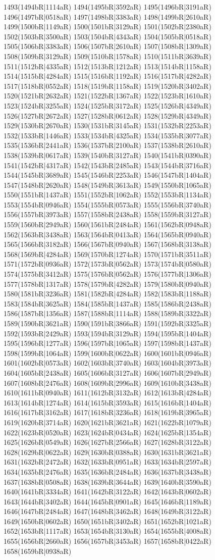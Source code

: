 1493(1494bR|1114aR) 1494(1495bR|3592aR) 1495(1496bR|3191aR) 1496(1497bR|0518aR) 1497(1498bR|3383aR) 1498(1499bR|2610aR) 1499(1500bR|1149aR) 1500(1501bR|3129aR) 1501(1502bR|2380aR) 1502(1503bR|3500aR) 1503(1504bR|4343aR) 1504(1505bR|0518aR) 1505(1506bR|3383aR) 1506(1507bR|2610aR) 1507(1508bR|1309aR) 1508(1509bR|3129aR) 1509(1510bR|1578aR) 1510(1511bR|3639aR) 1511(1512bR|4335aR) 1512(1513bR|1212aR) 1513(1514bR|1158aR) 1514(1515bR|4284aR) 1515(1516bR|1192aR) 1516(1517bR|4282aR) 1517(1518bR|0552aR) 1518(1519bR|1158aR) 1519(1520bR|3402aR) 1520(1521bR|2632aR) 1521(1522bR|1367aR) 1522(1523bR|1610aR) 1523(1524bR|3255aR) 1524(1525bR|3172aR) 1525(1526bR|4349aR) 1526(1527bR|2672aR) 1527(1528bR|0612aR) 1528(1529bR|4349aR) 1529(1530bR|2670aR) 1530(1531bR|3145aR) 1531(1532bR|2253aR) 1532(1533bR|1446aR) 1533(1534bR|4325aR) 1534(1535bR|3077aR) 1535(1536bR|2441aR) 1536(1537bR|2100aR) 1537(1538bR|2610aR) 1538(1539bR|0617aR) 1539(1540bR|3127aR) 1540(1541bR|0390aR) 1541(1542bR|4317aR) 1542(1543bR|2485aR) 1543(1544bR|3716aR) 1544(1545bR|3689aR) 1545(1546bR|2253aR) 1546(1547bR|1404aR) 1547(1548bR|2620aR) 1548(1549bR|3613aR) 1549(1550bR|1065aR) 1550(1551bR|1437aR) 1551(1552bR|1062aR) 1552(1553bR|1134aR) 1553(1554bR|0946aR) 1554(1555bR|0573aR) 1555(1556bR|3740aR) 1556(1557bR|3973aR) 1557(1558bR|2438aR) 1558(1559bR|3127aR) 1559(1560bR|2949aR) 1560(1561bR|2484aR) 1561(1562bR|0948aR) 1562(1563bR|3438aR) 1563(1564bR|0413aR) 1564(1565bR|0940aR) 1565(1566bR|3182aR) 1566(1567bR|0940aR) 1567(1568bR|3138aR) 1568(1569bR|4284aR) 1569(1570bR|1274aR) 1570(1571bR|3511aR) 1571(1572bR|0936aR) 1572(1573bR|0562aR) 1573(1574bR|0580aR) 1574(1575bR|3412aR) 1575(1576bR|0562aR) 1576(1577bR|1306aR) 1577(1578bR|1317aR) 1578(1579bR|4282aR) 1579(1580bR|0940aR) 1580(1581bR|3236aR) 1581(1582bR|4284aR) 1582(1583bR|1188aR) 1583(1584bR|3625aR) 1584(1585bR|1437aR) 1585(1586bR|2438aR) 1586(1587bR|1356aR) 1587(1588bR|1114aR) 1588(1589bR|3322aR) 1589(1590bR|3621aR) 1590(1591bR|3866aR) 1591(1592bR|3325aR) 1592(1593bR|2429aR) 1593(1594bR|3129aR) 1594(1595bR|1404aR) 1595(1596bR|1277aR) 1596(1597bR|1065aR) 1597(1598bR|1437aR) 1598(1599bR|1064aR) 1599(1600bR|0622aR) 1600(1601bR|0946aR) 1601(1602bR|0573aR) 1602(1603bR|3740aR) 1603(1604bR|3973aR) 1604(1605bR|2438aR) 1605(1606bR|3127aR) 1606(1607bR|2949aR) 1607(1608bR|2476aR) 1608(1609bR|2996aR) 1609(1610bR|3438aR) 1610(1611bR|0940aR) 1611(1612bR|3132aR) 1612(1613bR|4284aR) 1613(1614bR|1274aR) 1614(1615bR|3593aR) 1615(1616bR|1404aR) 1616(1617bR|3162aR) 1617(1618bR|3236aR) 1618(1619bR|3965aR) 1619(1620bR|3714aR) 1620(1621bR|3621aR) 1621(1622bR|1079aR) 1622(1623bR|0520aR) 1623(1624bR|0434aR) 1624(1625bR|1354aR) 1625(1626bR|0549aR) 1626(1627bR|2566aR) 1627(1628bR|3122aR) 1628(1629bR|0622aR) 1629(1630bR|0388aR) 1630(1631bR|3621aR) 1631(1632bR|2472aR) 1632(1633bR|0951aR) 1633(1634bR|2597aR) 1634(1635bR|2476aR) 1635(1636bR|2484aR) 1636(1637bR|3438aR) 1637(1638bR|0508aR) 1638(1639bR|3644aR) 1639(1640bR|3590aR) 1640(1641bR|3334aR) 1641(1642bR|3122aR) 1642(1643bR|0602aR) 1643(1644bR|3402aR) 1644(1645bR|0901aR) 1645(1646bR|1189aR) 1646(1647bR|2484aR) 1647(1648bR|3462aR) 1648(1649bR|3122aR) 1649(1650bR|0602aR) 1650(1651bR|3402aR) 1651(1652bR|1021aR) 1652(1653bR|1117aR) 1653(1654bR|3130aR) 1654(1655bR|4008aR) 1655(1656bR|2660aR) 1656(1657bR|3453aR) 1657(1658bR|0422aR) 1658(1659bR|0938aR) 